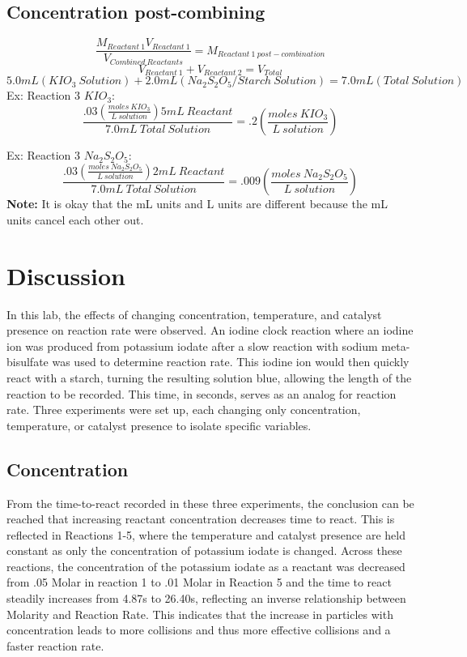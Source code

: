 \documentclass{article}
\begin{document}
\subsection{Concentration post-combining}
$$\frac{M_{Reactant\ 1}V_{Reactant\ 1}}{V_{Combined\ Reactants}} = M_{Reactant\ 1\ post-combination}$$
$$V_{Reactant\ 1} + V_{Reactant\ 2} = V_{Total}$$
$$5.0mL(KIO_3\ Solution) + 2.0mL(Na_2S_2O_5/Starch\ Solution) = 7.0mL(Total\ Solution)$$
Ex: Reaction 3 $KIO_3$: 
$$\frac{.03(\frac{moles\ KIO_3}{L\ solution})5mL\ Reactant}{7.0mL\ Total\ Solution} = .2(\frac{moles\ KIO_3}{L\ solution}) $$

Ex: Reaction 3 $Na_2S_2O_5$: 
$$\frac{.03(\frac{moles\ Na_2S_2O_5}{L\ solution})2mL\ Reactant}{7.0mL\ Total\ Solution} = .009(\frac{moles\ Na_2S_2O_5}{L\ solution}) $$
\textbf{Note:} It is okay that the mL units and L units are different because the mL units cancel each other out. 
\section{Discussion}
In this lab, the effects of changing concentration, temperature, and catalyst presence on reaction rate were observed. An iodine clock reaction where an iodine ion was produced from potassium iodate after a slow reaction with sodium meta-bisulfate was used to determine reaction rate.  This iodine ion would then quickly react with a starch, turning the resulting solution blue, allowing the length of the reaction to be recorded. This time, in seconds, serves as an analog for reaction rate. Three experiments were set up, each changing only concentration, temperature, or catalyst presence to isolate specific variables. 
\subsection{Concentration}
From the time-to-react recorded in these three experiments, the conclusion can be reached that increasing reactant concentration decreases time to react.  This is reflected in Reactions 1-5, where the temperature and catalyst presence are held constant as only the concentration of potassium iodate is changed.  Across these reactions, the concentration of the potassium iodate as a reactant was decreased from .05 Molar in reaction 1 to .01 Molar in Reaction 5 and the time to react steadily increases from 4.87s to 26.40s, reflecting an inverse relationship between Molarity and Reaction Rate. This indicates that the increase in particles with concentration leads to more collisions and thus more effective collisions and a faster reaction rate.
\end{document}
